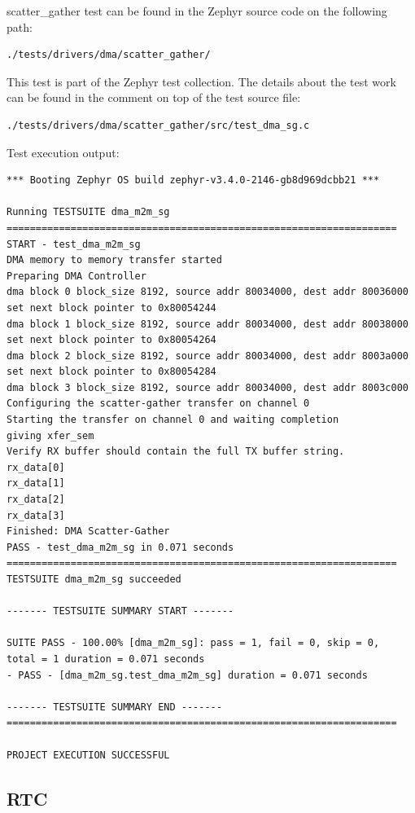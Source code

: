 \documentclass[11pt,a4paper,oneside]{article}
\begin{document}
scatter\_gather test can be found in the Zephyr source code on the
following path:
\begin{lstlisting}
./tests/drivers/dma/scatter_gather/
\end{lstlisting}

This test is part of the Zephyr test collection. The details about the
test work can be found in the comment on top of the test source file:
\begin{lstlisting}
./tests/drivers/dma/scatter_gather/src/test_dma_sg.c
\end{lstlisting}

Test execution output:

\begin{lstlisting}
*** Booting Zephyr OS build zephyr-v3.4.0-2146-gb8d969dcbb21 ***

Running TESTSUITE dma_m2m_sg
===================================================================
START - test_dma_m2m_sg
DMA memory to memory transfer started
Preparing DMA Controller
dma block 0 block_size 8192, source addr 80034000, dest addr 80036000
set next block pointer to 0x80054244
dma block 1 block_size 8192, source addr 80034000, dest addr 80038000
set next block pointer to 0x80054264
dma block 2 block_size 8192, source addr 80034000, dest addr 8003a000
set next block pointer to 0x80054284
dma block 3 block_size 8192, source addr 80034000, dest addr 8003c000
Configuring the scatter-gather transfer on channel 0
Starting the transfer on channel 0 and waiting completion
giving xfer_sem
Verify RX buffer should contain the full TX buffer string.
rx_data[0]
rx_data[1]
rx_data[2]
rx_data[3]
Finished: DMA Scatter-Gather
PASS - test_dma_m2m_sg in 0.071 seconds
===================================================================
TESTSUITE dma_m2m_sg succeeded

------- TESTSUITE SUMMARY START -------

SUITE PASS - 100.00% [dma_m2m_sg]: pass = 1, fail = 0, skip = 0,
total = 1 duration = 0.071 seconds
- PASS - [dma_m2m_sg.test_dma_m2m_sg] duration = 0.071 seconds

------- TESTSUITE SUMMARY END -------
===================================================================

PROJECT EXECUTION SUCCESSFUL
\end{lstlisting}

\subsection{RTC}\label{rtc}
\end{document}
